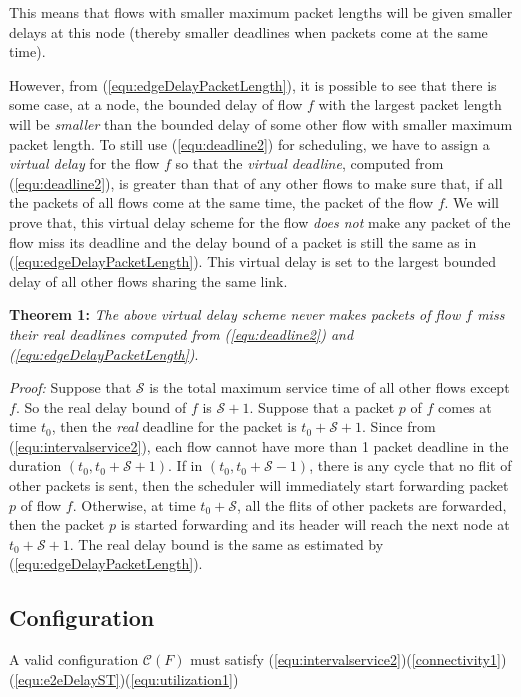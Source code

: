 \documentclass[conference, twocolumn]{IEEEtran}
\theoremstyle{definition}
\begin{document}
This means that flows with smaller maximum packet lengths will be given smaller
delays at this node (thereby smaller deadlines when packets come at the same
time).

However, from (\ref{equ:edgeDelayPacketLength}), it is possible to see that
there is some case, at a node, the bounded delay of flow $f$ with the largest packet length
will be {\em smaller} than the bounded delay of some other flow with smaller
maximum packet length. To still use (\ref{equ:deadline2}) for scheduling, we
have to assign a {\em virtual delay} for the flow $f$ so that the {\em virtual deadline},
computed from (\ref{equ:deadline2}), is greater than that of any other flows to
make sure that, if all the packets of all flows come at the same time, the
packet of the flow $f$. We will prove that, this virtual delay scheme for the
flow {\em does not} make any packet of the flow miss its deadline and the delay
bound of a packet is still the same as in (\ref{equ:edgeDelayPacketLength}).
This virtual delay is set to the largest bounded delay of all other flows
sharing the same link.

{\textbf{Theorem 1:}} {\em  The above virtual delay scheme never makes
packets of flow $f$ miss their real deadlines computed from
(\ref{equ:deadline2}) and (\ref{equ:edgeDelayPacketLength})}.

{\em Proof:} Suppose that $\mathcal{S}$ is the total maximum service time of all
other flows except $f$. So the real delay bound of $f$ is ${\mathcal S}+1$.
Suppose that a packet $p$ of $f$ comes at time $t_0$, then the {\em real}
deadline for the packet is $t_0+{\mathcal S}+1$. Since from
(\ref{equ:intervalservice2}), each flow cannot have more than 1
packet deadline in the duration $(t_0, t_0+{\mathcal S}+1)$. If in
$(t_0, t_0+{\mathcal S}-1)$, there is any cycle that no flit of other packets is
sent, then the scheduler will immediately start forwarding packet $p$ of flow $f$.
Otherwise, at time $t_0+{\mathcal S}$, all the flits of other packets are
forwarded, then the packet $p$ is started forwarding and its header will reach
the next node at $t_0+{\mathcal S}+1$. The real delay bound is the same as
estimated by (\ref{equ:edgeDelayPacketLength}).

\subsection{Configuration}
A valid configuration ${\mathcal C}(F)$ must satisfy
(\ref{equ:intervalservice2})(\ref{connectivity1}) (\ref{equ:e2eDelayST})(\ref{equ:utilization1})
\end{document}
